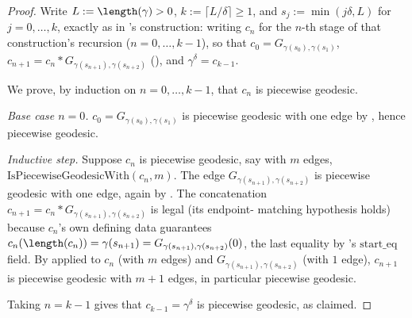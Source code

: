 \begin{proof}
  Write $L := \length(\gamma) > 0$, $k := \lceil L/\delta\rceil \ge 1$, and $s_j :=
  \min(j\delta,L)$ for $j=0,\dots,k$, exactly as in 's construction: writing
  $c_n$ for the $n$-th stage of that construction's recursion ($n=0,\dots,k-1$), so that
  $c_0 = G_{\gamma(s_0),\gamma(s_1)}$, $c_{n+1} = c_n * G_{\gamma(s_{n+1}),\gamma(s_{n+2})}$
  (), and $\gamma^\delta = c_{k-1}$.

  We prove, by induction on $n=0,\dots,k-1$, that $c_n$ is piecewise geodesic.

  \emph{Base case $n=0$.} $c_0 = G_{\gamma(s_0),\gamma(s_1)}$ is piecewise geodesic with one edge by
  , hence piecewise geodesic.

  \emph{Inductive step.} Suppose $c_n$ is piecewise geodesic, say with $m$ edges,
  $\mathrm{IsPiecewiseGeodesicWith}(c_n,m)$. The edge $G_{\gamma(s_{n+1}),\gamma(s_{n+2})}$ is
  piecewise geodesic with one edge, again by . The
  concatenation $c_{n+1} = c_n * G_{\gamma(s_{n+1}),\gamma(s_{n+2})}$ is legal (its endpoint-
  matching hypothesis holds) because $c_n$'s own defining data guarantees
  $c_n(\length(c_n)) = \gamma(s_{n+1}) = G_{\gamma(s_{n+1}),\gamma(s_{n+2})}(0)$, the last equality
  by 's $\mathrm{start\_eq}$ field. By 
  applied to $c_n$ (with $m$ edges) and $G_{\gamma(s_{n+1}),\gamma(s_{n+2})}$ (with $1$ edge),
  $c_{n+1}$ is piecewise geodesic with $m+1$ edges, in particular piecewise geodesic.

  Taking $n=k-1$ gives that $c_{k-1} = \gamma^\delta$ is piecewise geodesic, as claimed.
\end{proof}
